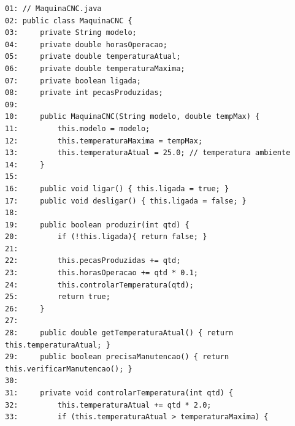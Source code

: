 \documentclass[12pt,a4paper]{article}
\begin{document}
\begin{enumerate}
\begin{center}
    \end{center}
\begin{small}
\begin{lstlisting}
01: // MaquinaCNC.java
02: public class MaquinaCNC {
03:     private String modelo;
04:     private double horasOperacao;
05:     private double temperaturaAtual;
06:     private double temperaturaMaxima;
07:     private boolean ligada;
08:     private int pecasProduzidas;
09: 
10:     public MaquinaCNC(String modelo, double tempMax) {
11:         this.modelo = modelo;
12:         this.temperaturaMaxima = tempMax;
13:         this.temperaturaAtual = 25.0; // temperatura ambiente
14:     }
15: 
16:     public void ligar() { this.ligada = true; }
17:     public void desligar() { this.ligada = false; }
18: 
19:     public boolean produzir(int qtd) {
20:         if (!this.ligada){ return false; }
21: 
22:         this.pecasProduzidas += qtd;
23:         this.horasOperacao += qtd * 0.1;
24:         this.controlarTemperatura(qtd);
25:         return true;
26:     }
27: 
28:     public double getTemperaturaAtual() { return this.temperaturaAtual; }
29:     public boolean precisaManutencao() { return this.verificarManutencao(); }
30: 
31:     private void controlarTemperatura(int qtd) {
32:         this.temperaturaAtual += qtd * 2.0;
33:         if (this.temperaturaAtual > temperaturaMaxima) {

\end{lstlisting}
\end{small}
\end{enumerate}
\end{document}
